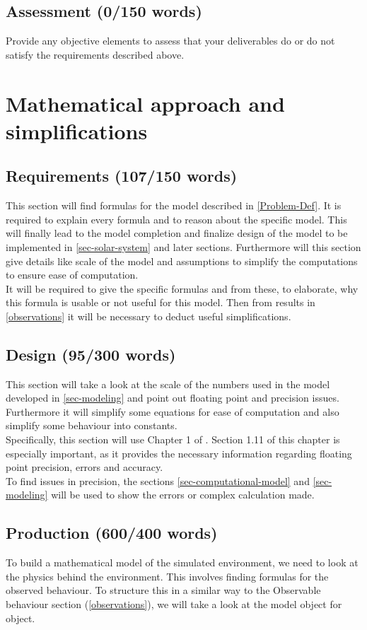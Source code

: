\documentclass[conference,compsoc]{IEEEtran}
\begin{document}
\subsection{Assessment (0/150 words)}
Provide any objective elements to assess that your deliverables do or do not satisfy the requirements described above. 

\section{Mathematical approach and simplifications}
\label{sec-simplify}
\subsection{Requirements (107/150 words)}
This section will find formulas for the model described in \ref{Problem-Def}. It is required to explain every formula and to reason about the specific model. This will finally lead to the model completion and finalize design of the model to be implemented in \ref{sec-solar-system} and later sections. Furthermore will this section give details like scale of the model and assumptions to simplify the computations to ensure ease of computation. \\
It will be required to give the specific formulas and from these, to elaborate, why this formula is usable or not useful for this model. Then from results in \ref{observations} it will be necessary to deduct useful simplifications.
\subsection{Design (95/300 words)}
This section will take a look at the scale of the numbers used in the model developed in \ref{sec-modeling} and point out floating point and precision issues. Furthermore it will simplify some equations for ease of computation and also simplify some behaviour into constants.\\
Specifically, this section will use Chapter 1 of \cite{ComputationalModelsIntroduction}. Section 1.11 of this chapter is especially important, as it provides the necessary information regarding floating point precision, errors and accuracy. \\
To find issues in precision, the sections \ref{sec-computational-model} and \ref{sec-modeling} will be used to show the errors or complex calculation made.
\subsection{Production (600/400 words)}
To build a mathematical model of the simulated environment, we need to look at the physics behind the environment. This involves finding formulas for the observed behaviour. To structure this in a similar way to the Observable behaviour section (\ref{observations}), we will take a look at the model object for object.
\end{document}
